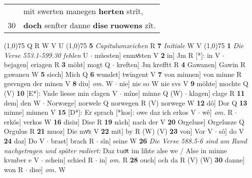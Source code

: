 \documentclass[8pt,a4paper,notitlepage]{article}
\begin{document}
\begin{table}[ht]
\begin{minipage}[t]{0.5\linewidth}
\begin{tabular}{rl}
 & mit swerten manegen \textbf{herten} strît,\\ 
30 & \textbf{doch} senfter danne \textbf{dise} \textbf{ruowens} zît.\\ 
\end{tabular}
\scriptsize
\line(1,0){75} \newline
Q R W V U \newline
\line(1,0){75} \newline
\textbf{5} \textit{Capitulumzeichen} R  \textbf{7} \textit{Initiale} W V  \newline
\line(1,0){75} \newline
\textbf{1} \textit{Die Verse 553.1-599.30 fehlen} U   $\cdot$ müesten] enmvͤsten V \textbf{2} in] Jm R [*]: in V  $\cdot$ bejagen] eriagen R \textbf{3} möht] mogt Q  $\cdot$ kreften] Jm krefftt R \textbf{4} Gawanen] Gawin R gawaneu W \textbf{5} siech] Mich Q \textbf{6} wundet] twingent V \textbf{7} von minnen] von minne R gesvngen der minen V \textbf{8} diu] \textit{om.} W  $\cdot$ nie] nie so W nie svs V \textbf{9} möhte] mochte Q (V) \textbf{10} [E*]: Vnde liesse min clagen V  $\cdot$ mîne] minne Q (W)  $\cdot$ klagen] clage R \textbf{11} dem] den W  $\cdot$ Norwæge] norwele Q norwegen R (V) norwege W \textbf{12} dô] Dor Q \textbf{13} minne] minnen V \textbf{15} [D*]: Er sprach [*kos]: owe daz ich erkos V  $\cdot$ wê] \textit{om.} R  $\cdot$ erkôs] verkos W \textbf{16} disiu] Dise R \textbf{19} nâch] nach der V \textbf{20} Orgeluse] Orgelusze Q Orgulus R \textbf{21} muoz] Die mvͦz V \textbf{22} mit] by R (W) (V) \textbf{23} von] Vor V  $\cdot$ sô] do V \textbf{24} daz] Do V  $\cdot$ brast] brach R  $\cdot$ sîn] seine W \textbf{26} \textit{Die Verse 588.5-6 sind am Rand nachgetragen und später radiert:} Daz tuoͧt im lihte alse we / Alse in minne kvmber e V   $\cdot$ schein] schied R  $\cdot$ in] \textit{om.} R \textbf{28} ouch] och da R (V) (W) \textbf{30} danne] won R  $\cdot$ dise] \textit{om.} W \newline
\end{minipage}
\end{table}
\end{document}
